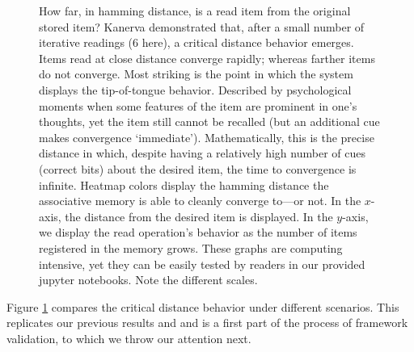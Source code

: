 \begin{figure}[h!]
\centering


\caption{How far, in hamming distance, is a read item from the original stored item? Kanerva demonstrated that, after a small number of iterative readings (6 here), a critical distance behavior emerges. Items read at close distance converge rapidly; whereas farther items do not converge. Most striking is the point in which the system displays the tip-of-tongue behavior. Described by psychological moments when some features of the item are prominent in one's thoughts, yet the item still cannot be recalled (but an additional cue makes convergence `immediate'). Mathematically, this is the precise distance in which, despite having a relatively high number of cues (correct bits) about the desired item, the time to convergence is infinite.   Heatmap colors display the hamming distance the associative memory is able to cleanly converge to---or not.   In the $x$-axis, the distance from the desired item is displayed. In the $y$-axis, we display the read operation's behavior as the number of items registered in the memory grows.  These graphs are computing intensive, yet they can be easily tested by readers in our provided jupyter notebooks. Note the different scales.}
\label{fig:crit-dist-10k-writes}

\end{figure}

Figure \ref{fig:crit-dist-10k-writes} compares the critical distance behavior under different scenarios.  This replicates our previous results \citet{Brogliato2011} and \citet{brogliato2014sparse} and is a first part of the process of framework validation, to which we throw our attention next.
